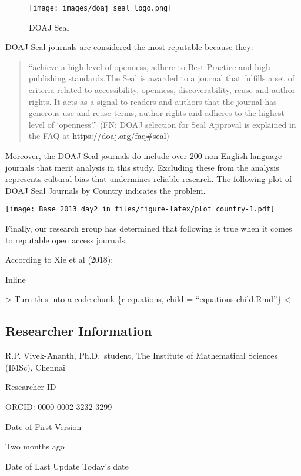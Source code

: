 \documentclass[]{article}
\begin{document}
\begin{figure}
\centering
\texttt{[image: images/doaj\_seal\_logo.png]}
\caption{DOAJ Seal}
\end{figure}

DOAJ Seal journals are considered the most reputable because they:

\begin{quote}
``achieve a high level of openness, adhere to Best Practice and high
publishing standards.The Seal is awarded to a journal that fulfills a
set of criteria related to accessibility, openness, discoverability,
reuse and author rights. It acts as a signal to readers and authors that
the journal has generous use and reuse terms, author rights and adheres
to the highest level of `openness'.'' (FN: DOAJ selection for Seal
Approval is explained in the FAQ at \url{https://doaj.org/faq\#seal})
\end{quote}

Moreover, the DOAJ Seal journals do include over 200 non-English
language journals that merit analysis in this study. Excluding these
from the analysis represents cultural bias that undermines reliable
research. The following plot of DOAJ Seal Journals by Country indicates
the problem.

\texttt{[image: Base\_2013\_day2\_in\_files/figure-latex/plot\_country-1.pdf]}

Finally, our research group has determined that following is true when
it comes to reputable open access journals.

According to Xie et al (2018):

Inline

\textbar{}\textbar{}\textgreater{} Turn this into a code chunk \{r
equations, child = ``equations-child.Rmd''\}
\textless{}\textbar{}\textbar{}

\subsection{Researcher Information}\label{researcher-information}

R.P. Vivek-Ananth, Ph.D.~student, The Institute of Mathematical Sciences
(IMSc), Chennai

Researcher ID

ORCID: \href{https://orcid.org/0000-0002-3232-3299}{0000-0002-3232-3299}

Date of First Version

Two months ago

Date of Last Update Today's date
\end{document}
